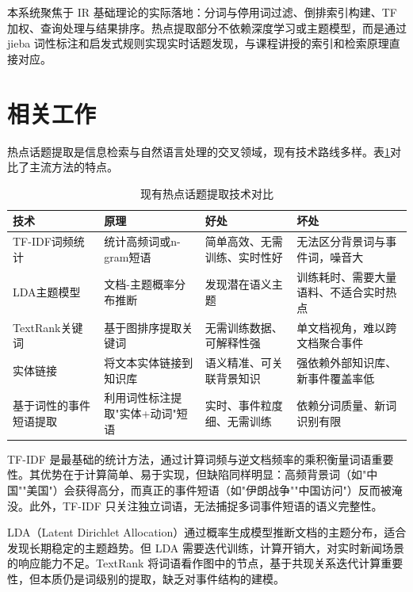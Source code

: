 \documentclass[UTF8,a4paper,zihao=5]{ctexart}
\begin{document}
本系统聚焦于 IR 基础理论的实际落地：分词与停用词过滤、倒排索引构建、TF 加权、查询处理与结果排序。热点提取部分不依赖深度学习或主题模型，而是通过 jieba 词性标注和启发式规则实现实时话题发现，与课程讲授的索引和检索原理直接对应。

\section{相关工作}

热点话题提取是信息检索与自然语言处理的交叉领域，现有技术路线多样。表\ref{tab:related}对比了主流方法的特点。

\begin{table}[!htbp]
  \centering
  \caption{现有热点话题提取技术对比}
  \label{tab:related}
  \begin{tabular}{p{3cm}p{4cm}p{3.5cm}p{3.5cm}}
  \toprule
  技术 & 原理 & 好处 & 坏处 \\
  \midrule
  TF-IDF词频统计 & 统计高频词或n-gram短语 & 简单高效、无需训练、实时性好 & 无法区分背景词与事件词，噪音大 \\
  LDA主题模型 & 文档-主题概率分布推断 & 发现潜在语义主题 & 训练耗时、需要大量语料、不适合实时热点 \\
  TextRank关键词 & 基于图排序提取关键词 & 无需训练数据、可解释性强 & 单文档视角，难以跨文档聚合事件 \\
  实体链接 & 将文本实体链接到知识库 & 语义精准、可关联背景知识 & 强依赖外部知识库、新事件覆盖率低 \\
  基于词性的事件短语提取 & 利用词性标注提取"实体+动词"短语 & 实时、事件粒度细、无需训练 & 依赖分词质量、新词识别有限 \\
  \bottomrule
  \end{tabular}
\end{table}

TF-IDF 是最基础的统计方法，通过计算词频与逆文档频率的乘积衡量词语重要性。其优势在于计算简单、易于实现，但缺陷同样明显：高频背景词（如"中国""美国"）会获得高分，而真正的事件短语（如"伊朗战争""中国访问"）反而被淹没。此外，TF-IDF 只关注独立词语，无法捕捉多词事件短语的语义完整性。

LDA（Latent Dirichlet Allocation）通过概率生成模型推断文档的主题分布，适合发现长期稳定的主题趋势。但 LDA 需要迭代训练，计算开销大，对实时新闻场景的响应能力不足。TextRank 将词语看作图中的节点，基于共现关系迭代计算重要性，但本质仍是词级别的提取，缺乏对事件结构的建模。
\end{document}
